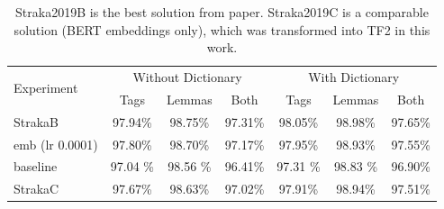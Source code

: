 \begin{table}[!h]
  \begin{tabular}{|l||c|c|c||c|c|c|}
  \hline
\multirow{2}{*}{Experiment} & \multicolumn{3}{c||}{Without Dictionary}  &
      \multicolumn{3}{c|}{With Dictionary} \\ 
    & Tags & Lemmas & Both & Tags & Lemmas & Both \\ \hline \hline
    StrakaB & 97.94\% & 98.75\% & 97.31\% & 98.05\% & 98.98\% & 97.65\% \\ \hline
    emb (lr 0.0001) &  97.80\% & 98.70\% & 97.17\% & 97.95\% & 98.93\% & 97.55\% \\ \hline
    baseline & 97.04 \% & 98.56 \% & 96.41\% &  97.31  \% & 98.83 \% & 96.90\% \\ \hline 
    StrakaC & 97.67\% & 98.63\% & 97.02\% & 97.91\% & 98.94\% & 97.51\% \\ \hline
  \end{tabular}
  \caption{%
  Straka2019B is the best solution from \citep{Straka2019} paper. Straka2019C is a comparable solution  (BERT embeddings only), which was transformed into TF2 in this work.} 
\end{table}


